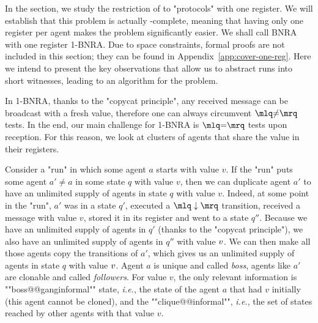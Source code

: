 In the section, we study the restriction of \COVER to "protocols" with one register. We will establish that this problem is actually \NP-complete, meaning that having only one register per agent makes the problem significantly easier. 
	We shall call BNRA with one register 1-BNRA. Due to space constraints, formal proofs are not included in this section; they can be found in Appendix~\ref{app:cover-one-reg}. Here we intend to present the key observations that allow us to abstract runs into short witnesses, leading to an \NP algorithm for the problem.
	
	In 1-BNRA, thanks to the "copycat principle", any received message can be broadcast with a fresh value, therefore one can always circumvent $\quotemarks{\diseqtestact}$ tests. In the end, our main challenge for 1-BNRA is $\quotemarks{\eqtestact}$ tests upon reception.
	For this reason, we look at clusters of agents that share the value in their registers. 

	Consider a "run" in which some agent $a$ starts with value $v$. If the "run" puts some agent $a' \ne a$ in some state $q$ with value $v$, then we can duplicate agent $a'$ to have an unlimited supply of agents in state $q$ with value $v$. Indeed, at some point in the "run", $a'$ was in a state $q'$, executed a $\quotemarks{\enregact}$ transition, received a message with value $v$, stored it in its register and went to a state $q''$. Because we have an unlimited supply of agents in $q'$ (thanks to the "copycat principle"), we also have an unlimited supply of agents in $q''$ with value $v$. We can then make all those agents copy the transitions of $a'$, which gives us an unlimited supply of agents in state $q$ with value $v$. Agent $a$ is unique and called \emph{boss}, agents like $a'$ are clonable and called \emph{followers}. For value $v$, the only relevant information is ""boss@@ganginformal"" state, \emph{i.e.}, the state of the agent $a$ that had $v$ initially (this agent cannot be cloned), and the ""clique@@informal"", \emph{i.e.}, the set of states reached by other agents with that value $v$. 

